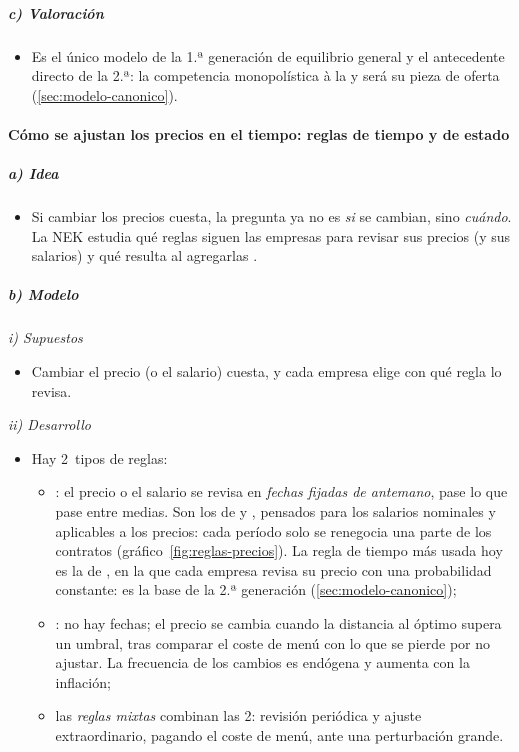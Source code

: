 \documentclass[11pt]{article}
\begin{document}
\subparagraph{c) Valoración}

\begin{itemize}
\item Es el único modelo de la 1.ª generación de equilibrio general y el antecedente directo de la 2.ª: la competencia monopolística à la  y  será su pieza de oferta (\ref{sec:modelo-canonico}).
\end{itemize}

\paragraph{Cómo se ajustan los precios en el tiempo: reglas de tiempo y de estado}

\subparagraph{a) Idea}

\begin{itemize}
\item Si cambiar los precios cuesta, la pregunta ya no es \emph{si} se cambian, sino \emph{cuándo}. La NEK estudia qué reglas siguen las empresas para revisar sus precios (y sus salarios) y qué resulta al agregarlas .
\end{itemize}

\subparagraph{b) Modelo}

\hspace*{3.6em}\emph{i) Supuestos}

\begin{itemize}
\item Cambiar el precio (o el salario) cuesta, y cada empresa elige con qué regla lo revisa.
\end{itemize}

\hspace*{3.6em}\emph{ii) Desarrollo}

\begin{itemize}
\item Hay 2~tipos de reglas:
  \begin{itemize}
  \item {}: el precio o el salario se revisa en \emph{fechas fijadas de antemano}, pase lo que pase entre medias. Son los  de \textcite{Fischer1977Long} y \textcite{Taylor1979Staggered,Taylor1980Aggregate}, pensados para los salarios nominales y aplicables a los precios: cada período solo se renegocia una parte de los contratos (gráfico~\ref{fig:reglas-precios}). La regla de tiempo más usada hoy es la de \textcite{Calvo1983Staggered}, en la que cada empresa revisa su precio con una probabilidad constante: es la base de la 2.ª generación (\ref{sec:modelo-canonico});
  \item {}: no hay fechas; el precio se cambia cuando la distancia al óptimo supera un umbral, tras comparar el coste de menú con lo que se pierde por no ajustar\nocite{SheshinskiWeiss1977}. La frecuencia de los cambios es endógena y aumenta con la inflación;
  \item las \emph{reglas mixtas} combinan las 2: revisión periódica y ajuste extraordinario, pagando el coste de menú, ante una perturbación grande.
  \end{itemize}
\end{itemize}
\end{document}
